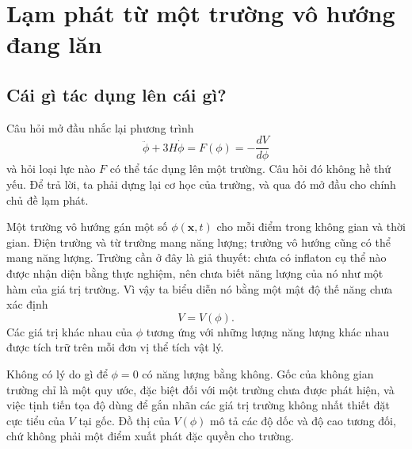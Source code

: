 \chapter{Lạm phát từ một trường vô hướng đang lăn}


\section{Cái gì tác dụng lên cái gì?}

Câu hỏi mở đầu nhắc lại phương trình
\begin{equation}
\ddot\phi+3H\dot\phi
=F(\phi)
=-\frac{dV}{d\phi}
\label{eq:c09-opening}
\end{equation}
và hỏi loại lực nào \(F\) có thể tác dụng lên một trường. Câu hỏi đó không hề thứ yếu. Để trả lời, ta phải dựng lại cơ học của trường, và qua đó mở đầu cho chính chủ đề lạm phát.

Một trường vô hướng gán một số \(\phi(\mathbf x,t)\) cho mỗi điểm trong không gian và thời gian. Điện trường và từ trường mang năng lượng; trường vô hướng cũng có thể mang năng lượng. Trường cần ở đây là giả thuyết: chưa có inflaton cụ thể nào được nhận diện bằng thực nghiệm, nên chưa biết năng lượng của nó như một hàm của giá trị trường. Vì vậy ta biểu diễn nó bằng một mật độ thế năng chưa xác định
\begin{equation}
V=V(\phi).
\label{eq:c09-potential}
\end{equation}
Các giá trị khác nhau của \(\phi\) tương ứng với những lượng năng lượng khác nhau được tích trữ trên mỗi đơn vị thể tích vật lý.

Không có lý do gì để \(\phi=0\) có năng lượng bằng không. Gốc của không gian trường chỉ là một quy ước, đặc biệt đối với một trường chưa được phát hiện, và việc tịnh tiến tọa độ dùng để gắn nhãn các giá trị trường không nhất thiết đặt cực tiểu của \(V\) tại gốc. Đồ thị của \(V(\phi)\) mô tả các độ dốc và độ cao tương đối, chứ không phải một điểm xuất phát đặc quyền cho trường.

